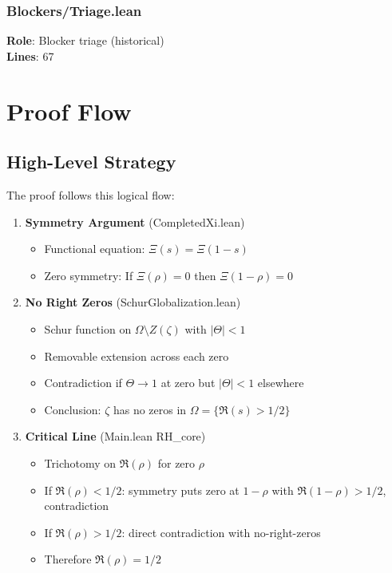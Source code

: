 \subsubsection{Blockers/Triage.lean}
\textbf{Role}: Blocker triage (historical)\\
\textbf{Lines}: 67

\section{Proof Flow}

\subsection{High-Level Strategy}

The proof follows this logical flow:

\begin{enumerate}
    \item \textbf{Symmetry Argument} (CompletedXi.lean)
    \begin{itemize}
        \item Functional equation: $\Xi(s) = \Xi(1-s)$
        \item Zero symmetry: If $\Xi(\rho) = 0$ then $\Xi(1-\rho) = 0$
    \end{itemize}
    
    \item \textbf{No Right Zeros} (SchurGlobalization.lean)
    \begin{itemize}
        \item Schur function on $\Omega \setminus Z(\zeta)$ with $|\Theta| < 1$
        \item Removable extension across each zero
        \item Contradiction if $\Theta \to 1$ at zero but $|\Theta| < 1$ elsewhere
        \item Conclusion: $\zeta$ has no zeros in $\Omega = \{\Re(s) > 1/2\}$
    \end{itemize}
    
    \item \textbf{Critical Line} (Main.lean RH\_core)
    \begin{itemize}
        \item Trichotomy on $\Re(\rho)$ for zero $\rho$
        \item If $\Re(\rho) < 1/2$: symmetry puts zero at $1-\rho$ with $\Re(1-\rho) > 1/2$, contradiction
        \item If $\Re(\rho) > 1/2$: direct contradiction with no-right-zeros
        \item Therefore $\Re(\rho) = 1/2$
    \end{itemize}
\end{enumerate}

